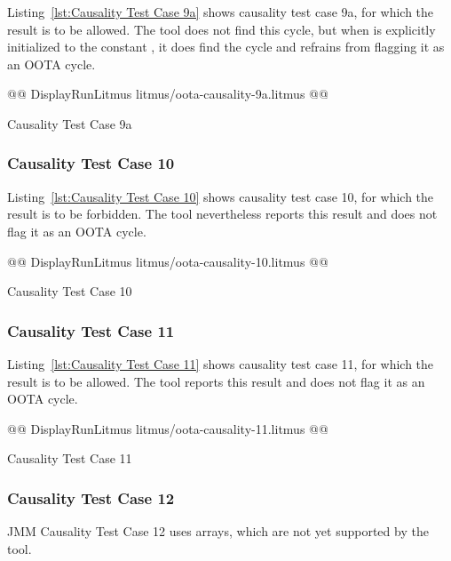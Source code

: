\documentclass[10]{article}
\begin{document}
Listing~\ref{lst:Causality Test Case 9a}
shows causality test case 9a, for which the 
result is to be allowed.
The  tool does not find this cycle, but when  is explicitly
initialized to the constant , it does find the cycle and refrains
from flagging it as an OOTA cycle.

\begin{listing}[tbp]
@@ DisplayRunLitmus litmus/oota-causality-9a.litmus @@
\caption{Causality Test Case 9a}
\label{lst:Causality Test Case 9a}
\end{listing}

\subsubsection{Causality Test Case 10}
\label{app:Causality Test Case 10}

Listing~\ref{lst:Causality Test Case 10}
shows causality test case 10, for which the 
result is to be forbidden.
The  tool nevertheless reports this result and does not flag it as
an OOTA cycle.

\begin{listing}[tbp]
@@ DisplayRunLitmus litmus/oota-causality-10.litmus @@
\caption{Causality Test Case 10}
\label{lst:Causality Test Case 10}
\end{listing}

\subsubsection{Causality Test Case 11}
\label{app:Causality Test Case 11}

Listing~\ref{lst:Causality Test Case 11}
shows causality test case 11, for which the 
result is to be allowed.
The  tool reports this result and does not flag it as an OOTA cycle.

\begin{listing}[tbp]
@@ DisplayRunLitmus litmus/oota-causality-11.litmus @@
\caption{Causality Test Case 11}
\label{lst:Causality Test Case 11}
\end{listing}

\subsubsection{Causality Test Case 12}
\label{app:Causality Test Case 12}

JMM Causality Test Case 12 uses arrays, which are not yet supported
by the  tool.
\end{document}
